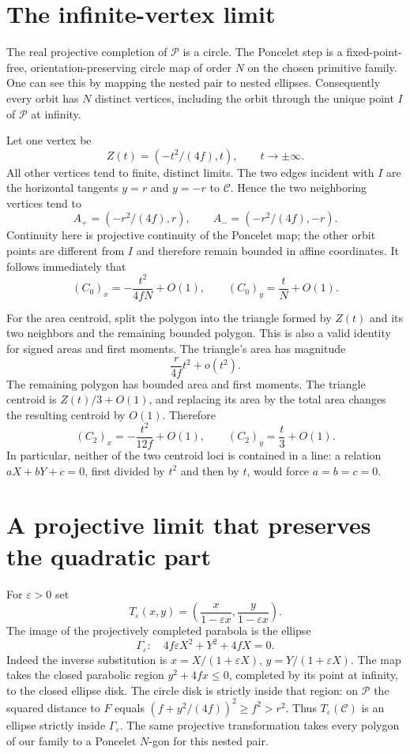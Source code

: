 \documentclass[11pt]{article}
\begin{document}
\section*{The infinite-vertex limit}
The real projective completion of $\mathcal P$ is a circle. The Poncelet
step is a fixed-point-free, orientation-preserving circle map of order
$N$ on the chosen primitive family. One can see this by mapping the
nested pair to nested ellipses. Consequently every orbit has $N$
distinct vertices, including the orbit through the unique point
$I$ of $\mathcal P$ at infinity.

Let one vertex be
\[
 Z(t)=(-t^2/(4f),t),\qquad t\longrightarrow\pm\infty.
\]
All other vertices tend to finite, distinct limits. The two edges
incident with $I$ are the horizontal tangents $y=r$ and $y=-r$ to
$\mathcal C$. Hence the two neighboring vertices tend to
\[
 A_+=(-r^2/(4f),r),\qquad A_-=(-r^2/(4f),-r).
\]
Continuity here is projective continuity of the Poncelet map; the
other orbit points are different from $I$ and therefore remain bounded
in affine coordinates. It follows immediately that
\begin{equation}\label{vertexlimit}
 (C_0)_x=-\frac{t^2}{4fN}+O(1),\qquad
 (C_0)_y=\frac{t}{N}+O(1).
\end{equation}

For the area centroid, split the polygon into the triangle formed by
$Z(t)$ and its two neighbors and the remaining bounded polygon. This
is also a valid identity for signed areas and first moments. The
triangle's area has magnitude
\[
 \frac{r}{4f}t^2+o(t^2).
\]
The remaining polygon has bounded area and first moments. The triangle
centroid is $Z(t)/3+O(1)$, and replacing its area by the total area
changes the resulting centroid by $O(1)$. Therefore
\begin{equation}\label{arealimit}
 (C_2)_x=-\frac{t^2}{12f}+O(1),\qquad
 (C_2)_y=\frac{t}{3}+O(1).
\end{equation}
In particular, neither of the two centroid loci is contained in a
line: a relation $aX+bY+c=0$, first divided by $t^2$ and then by $t$,
would force $a=b=c=0$.

\section*{A projective limit that preserves the quadratic part}
For $\varepsilon>0$ set
\[
 T_\varepsilon(x,y)=
 \left(\frac{x}{1-\varepsilon x},
       \frac{y}{1-\varepsilon x}\right).
\]
The image of the projectively completed parabola is the ellipse
\begin{equation}\label{outer}
 \Gamma_\varepsilon:\quad
 4f\varepsilon X^2+Y^2+4fX=0.
\end{equation}
Indeed the inverse substitution is
$x=X/(1+\varepsilon X)$, $y=Y/(1+\varepsilon X)$.
The map takes the closed parabolic region $y^2+4fx\leq0$, completed
by its point at infinity, to the closed ellipse disk. The circle disk
is strictly inside that region: on $\mathcal P$ the squared distance
to $F$ equals $(f+y^2/(4f))^2\geq f^2>r^2$.
Thus $T_\varepsilon(\mathcal C)$ is an ellipse strictly inside
$\Gamma_\varepsilon$. The same projective transformation takes every
polygon of our family to a Poncelet $N$-gon for this nested pair.
\end{document}
